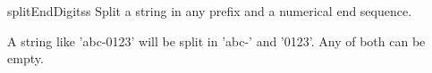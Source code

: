 \begin{funcdesc}{splitEndDigits}{s}
    Split a string in any prefix and a numerical end sequence.

    A string like 'abc-0123' will be split in 'abc-' and '0123'.
    Any of both can be empty.
\end{funcdesc} 




